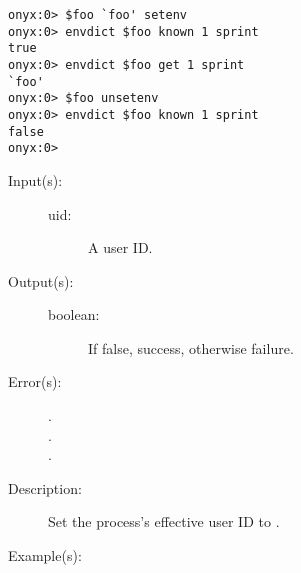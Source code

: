 \begin{description}
\begin{description}
\begin{verbatim}
onyx:0> $foo `foo' setenv
onyx:0> envdict $foo known 1 sprint
true
onyx:0> envdict $foo get 1 sprint
`foo'
onyx:0> $foo unsetenv
onyx:0> envdict $foo known 1 sprint
false
onyx:0>
		\end{verbatim}
	\end{description}
\label{systemdict:seteuid}
\item[{\onyxop{uid}{seteuid}{boolean}}: ]
	\begin{description}\item[]
	\item[Input(s): ]
		\begin{description}\item[]
		\item[uid: ]
			A user ID.
		\end{description}
	\item[Output(s): ]
		\begin{description}\item[]
		\item[boolean: ]
			If false, success, otherwise failure.
		\end{description}
	\item[Error(s): ]
		\begin{description}\item[]
		\item[.]
		\item[.]
		\item[.]
		\end{description}
	\item[Description: ]
		Set the process's effective user ID to .
	\item[Example(s): ]\begin{verbatim}


\end{verbatim}
\end{description}
\end{description}
